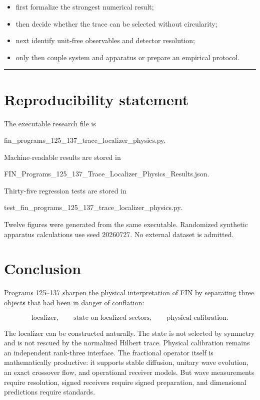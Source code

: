 \documentclass[11pt,a4paper,openany]{report}
\begin{document}
\begin{itemize}
\item 
first formalize the strongest numerical result;

\item 
then decide whether the trace can be selected without circularity;

\item 
next identify unit-free observables and detector resolution;

\item 
only then couple system and apparatus or prepare an empirical protocol.

\end{itemize}

\par\medskip\hrule\medskip

\chapter{Reproducibility statement}

The executable research file is

fin\_programs\_125\_137\_trace\_localizer\_physics.py.

Machine-readable results are stored in

FIN\_Programs\_125\_137\_Trace\_Localizer\_Physics\_Results.json.

Thirty-five regression tests are stored in

test\_fin\_programs\_125\_137\_trace\_localizer\_physics.py.

Twelve figures were generated from the same executable. Randomized synthetic apparatus calculations use seed 20260727. No external dataset is admitted.

\chapter{Conclusion}

Programs 125--137 sharpen the physical interpretation of FIN by separating three objects that had been in danger of conflation:

\[
\text{localizer},\qquad
\text{state on localized sectors},\qquad
\text{physical calibration}.
\]

The localizer can be constructed naturally. The state is not selected by symmetry and is not rescued by the normalized Hilbert trace. Physical calibration remains an independent rank-three interface. The fractional operator itself is mathematically productive: it supports stable diffusion, unitary wave evolution, an exact crossover flow, and operational receiver models. But wave measurements require resolution, signed receivers require signed preparation, and dimensional predictions require standards.
\end{document}
